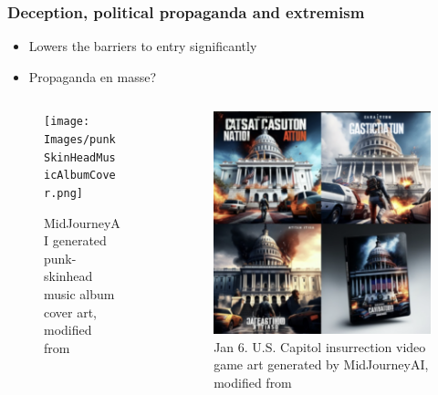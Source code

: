 \documentclass[
	11pt, compress%
]{beamer}
\begin{document}
\begin{frame}

	\frametitle{Deception, political propaganda and extremism}
	\begin{itemize}
		\item Lowers the barriers to entry significantly
		\item Propaganda en masse?
	\end{itemize}
	\begin{columns}[c] 
		\begin{column}{0.5\textwidth} %
			\begin{figure}
				\texttt{[image: Images/punkSkinHeadMusicAlbumCover.png]}
				\caption{\tiny MidJourneyAI generated punk-skinhead music album cover art, modified from }
			\end{figure}
		\end{column}
		\begin{column}{0.5\textwidth} %
			\begin{figure}
				\includegraphics[width=0.6\linewidth]{Images/GameCoverArtCapitolInsurrection.png}
				\caption{\tiny Jan 6. U.S. Capitol insurrection video game art generated by MidJourneyAI, modified from } 
			\end{figure}
		\end{column}
	\end{columns}

\end{frame}
\end{document}
